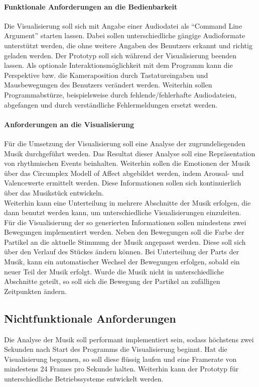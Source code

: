 \documentclass[11pt,a4paper]{article}
\begin{document}
\paragraph{Funktionale Anforderungen an die Bedienbarkeit}
Die Visualisierung soll sich mit Angabe einer Audiodatei als ``Command Line Argument'' starten lassen. Dabei sollen unterschiedliche gängige Audioformate unterstützt werden, die ohne weitere Angaben des Benutzers erkannt und richtig geladen werden. Der Prototyp soll sich während der Visualisierung beenden lassen. Als optionale Interaktionsmöglichkeit mit dem Programm kann die Perspektive bzw. die Kameraposition durch Tastatureingaben und Mausbewegungen des Benutzers verändert werden. Weiterhin sollen Programmabstürze, beispielsweise durch fehlende/fehlerhafte Audiodateien, abgefangen und durch verständliche Fehlermeldungen ersetzt werden.

\paragraph{Anforderungen an die Visualisierung}
Für die Umsetzung der Visualisierung soll eine Analyse der zugrundeliegenden Musik durchgeführt werden. Das Resultat dieser Analyse soll eine Repräsentation von rhythmischen Events beinhalten. Weiterhin sollen die Emotionen der Musik über das Circumplex Modell of Affect abgebildet werden, indem Arousal- und Valencewerte ermittelt werden. Diese Informationen sollen sich kontinuierlich über das Musikstück entwickeln.\\
Weiterhin kann eine Unterteilung in mehrere Abschnitte der Musik erfolgen, die dann benutzt werden kann, um unterschiedliche Visualisierungen einzuleiten.\\
Für die Visualisierung der so generierten Informationen sollen mindestens zwei Bewegungen implementiert werden. Neben den Bewegungen soll die Farbe der Partikel an die aktuelle Stimmung der Musik angepasst werden. Diese soll sich über den Verlauf des Stückes ändern können. Bei Unterteilung der Parts der Musik, kann ein automatischer Wechsel der Bewegungen erfolgen, sobald ein neuer Teil der Musik erfolgt. Wurde die Musik nicht in unterschiedliche Abschnitte geteilt, so soll sich die Bewegung der Partikel an zufälligen Zeitpunkten ändern.

\subsection{Nichtfunktionale Anforderungen}
Die Analyse der Musik soll performant implementiert sein, sodass höchstens zwei Sekunden nach Start des Programms die Visualisierung beginnt. Hat die Visualisierung begonnen, so soll diese flüssig laufen und eine Framerate von mindestens 24 Frames pro Sekunde halten. Weiterhin kann der Prototyp für unterschiedliche Betriebssysteme entwickelt werden.
\end{document}
